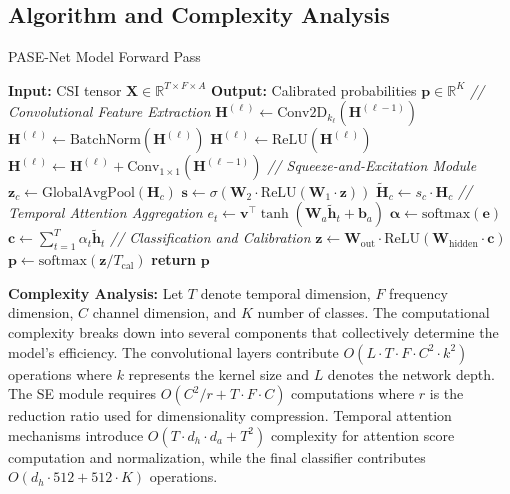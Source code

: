 \documentclass[journal]{IEEEtran}
\begin{document}
\subsection{Algorithm and Complexity Analysis}

\begin{algorithm}
\caption{PASE-Net Model Forward Pass}
\label{alg:enhanced}
\begin{algorithmic}[1]
\STATE \textbf{Input:} CSI tensor $\mathbf{X} \in \mathbb{R}^{T \times F \times A}$
\STATE \textbf{Output:} Calibrated probabilities $\mathbf{p} \in \mathbb{R}^K$
\STATE
\STATE \textit{// Convolutional Feature Extraction}
    \STATE $\mathbf{H}^{(\ell)} \leftarrow \text{Conv2D}_{k_\ell}(\mathbf{H}^{(\ell-1)})$ 
    \STATE $\mathbf{H}^{(\ell)} \leftarrow \text{BatchNorm}(\mathbf{H}^{(\ell)})$
    \STATE $\mathbf{H}^{(\ell)} \leftarrow \text{ReLU}(\mathbf{H}^{(\ell)})$
        \STATE $\mathbf{H}^{(\ell)} \leftarrow \mathbf{H}^{(\ell)} + \text{Conv}_{1\times1}(\mathbf{H}^{(\ell-1)})$
    \ENDIF
\ENDFOR
\STATE
\STATE \textit{// Squeeze-and-Excitation Module}
    \STATE $\mathbf{z}_c \leftarrow \text{GlobalAvgPool}(\mathbf{H}_c)$ 
    \STATE $\mathbf{s} \leftarrow \sigma(\mathbf{W}_2 \cdot \text{ReLU}(\mathbf{W}_1 \cdot \mathbf{z}))$ 
    \STATE $\tilde{\mathbf{H}}_c \leftarrow s_c \cdot \mathbf{H}_c$ 
\ENDFOR
\STATE
\STATE \textit{// Temporal Attention Aggregation}
    \STATE $e_t \leftarrow \mathbf{v}^\top \tanh(\mathbf{W}_a \tilde{\mathbf{h}}_t + \mathbf{b}_a)$ 
\ENDFOR
\STATE $\boldsymbol{\alpha} \leftarrow \text{softmax}(\mathbf{e})$ 
\STATE $\mathbf{c} \leftarrow \sum_{t=1}^T \alpha_t \tilde{\mathbf{h}}_t$ 
\STATE
\STATE \textit{// Classification and Calibration}
\STATE $\mathbf{z} \leftarrow \mathbf{W}_{\text{out}} \cdot \text{ReLU}(\mathbf{W}_{\text{hidden}} \cdot \mathbf{c})$
\STATE $\mathbf{p} \leftarrow \text{softmax}(\mathbf{z} / T_{\text{cal}})$ 
\STATE \textbf{return} $\mathbf{p}$
\end{algorithmic}
\end{algorithm}

\textbf{Complexity Analysis:} Let $T$ denote temporal dimension, $F$ frequency dimension, $C$ channel dimension, and $K$ number of classes. The computational complexity breaks down into several components that collectively determine the model's efficiency. The convolutional layers contribute $O(L \cdot T \cdot F \cdot C^2 \cdot k^2)$ operations where $k$ represents the kernel size and $L$ denotes the network depth. The SE module requires $O(C^2/r + T \cdot F \cdot C)$ computations where $r$ is the reduction ratio used for dimensionality compression. Temporal attention mechanisms introduce $O(T \cdot d_h \cdot d_a + T^2)$ complexity for attention score computation and normalization, while the final classifier contributes $O(d_h \cdot 512 + 512 \cdot K)$ operations.
\end{document}
